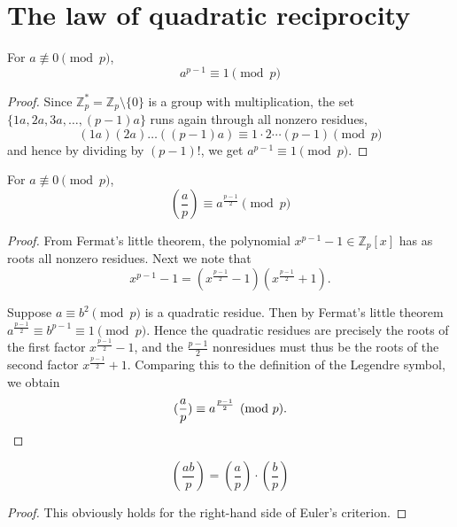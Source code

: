 \chapter{The law of quadratic reciprocity}


\begin{theorem}
  \label{fermats_little}
  \leanok
  For \(a \not\equiv 0 \pmod{p}\),
  \[
  a^{p - 1} \equiv 1 \pmod{p}
  \]
\end{theorem}
\begin{proof}
  Since $\mathbb{Z}_p^* = \mathbb{Z}_p \setminus \{0\}$ is a group with multiplication, the set $\{1a, 2a, 3a, \dots, (p-1)a\}$ runs again through all nonzero residues,
  \[
  (1a)(2a)\dots((p-1)a) \equiv 1\cdot 2 \cdots (p-1) \pmod{p}
  \]
  and hence by dividing by $(p - 1)!$, we get $a^{p - 1} \equiv 1 \pmod{p}$.
\end{proof}


\begin{theorem}
  \label{euler_criterion}
  \leanok
  For \(a \not\equiv 0 \pmod{p}\),
  \[
  (\frac{a}{p}) \equiv a ^{\frac{p-1}{2}} \pmod{p}
  \]
\end{theorem}
\begin{proof}
  From Fermat's little theorem, the polynomial $x^{p-1} - 1 \in \mathbb{Z}_p[x]$ has as roots all nonzero residues. Next we note that
  \[
  x^{p-1} - 1 = \left(x^{\frac{p-1}{2}} - 1\right)\left(x^{\frac{p-1}{2}} + 1\right).
  \]
  
  Suppose $a \equiv b^2 \pmod{p}$ is a quadratic residue. Then by Fermat's little theorem $a^{\frac{p-1}{2}} \equiv b^{p-1} \equiv 1 \pmod{p}$. Hence the quadratic residues are precisely the roots of the first factor $x^{\frac{p-1}{2}} - 1$, and the $\frac{p-1}{2}$ nonresidues must thus be the roots of the second factor $x^{\frac{p-1}{2}} + 1$. Comparing this to the definition of the Legendre symbol, we obtain
  \[
  (\frac{a}{p}) \equiv a^{\frac{p-1}{2}} \pmod{p}. \qedhere
  \]
\end{proof}

\begin{theorem}
  \label{product_rule}
  \leanok
  \begin{equation} \label{eq:product_rule}
    (\frac{ab}{p}) =   (\frac{a}{p}) \cdot   (\frac{b}{p})
  \end{equation}
\end{theorem}
\begin{proof}
  This obviously holds for the right-hand side of Euler's criterion.
\end{proof}

